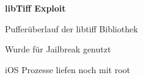 \begin{frame}
	\centering
	\textbf{libTiff Exploit}
	\begin{block}{}
		Pufferüberlauf der libtiff Bibliothek
	\end{block}
	\begin{block}{}
		Wurde für Jailbreak genutzt
	\end{block}
	\begin{block}{}
		iOS Prozesse liefen noch mit root
	\end{block}
\end{frame}